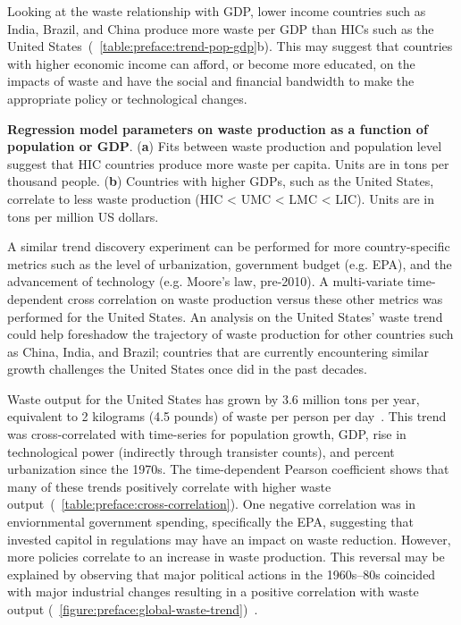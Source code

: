 \documentclass[../main/main]{subfiles}
\begin{document}
Looking at the waste relationship with GDP, lower income countries such as India, Brazil, and China produce more waste per GDP than HICs such as the United States~(\TABLE~\ref{table:preface:trend-pop-gdp}b). This may suggest that countries with higher economic income can afford, or become more educated, on the impacts of waste and have the social and financial bandwidth to make the appropriate policy or technological changes.

\begin{table}[H]
\small
\centering
	\begin{subtable}{.48\linewidth}
		\centering
		\caption{}
		
	\end{subtable}
	\begin{subtable}{.48\linewidth}
		\centering
		\caption{}
		
	\end{subtable}
	\caption[Regression model parameters on waste production as a function of population or GDP]
	{
		\textbf{Regression model parameters on waste production as a function of population or GDP}.
		(\textbf{a}) Fits between waste production and population level suggest that HIC countries produce more waste per capita. Units are in tons per thousand people.
		(\textbf{b}) Countries with higher GDPs, such as the United States, correlate to less waste production (HIC < UMC < LMC < LIC). Units are in tons per million US dollars.
	}
  \label{table:preface:trend-pop-gdp}
\end{table}

A similar trend discovery experiment can be performed for more country-specific metrics such as the level of urbanization, government budget (e.g. EPA), and the advancement of technology (e.g. Moore's law, pre-2010). A multi-variate time-dependent cross correlation on waste production versus these other metrics was performed for the United States. An analysis on the United States' waste trend could help foreshadow the trajectory of waste production for other countries such as China, India, and Brazil; countries that are currently encountering similar growth challenges the United States once did in the past decades.

Waste output for the United States has grown by 3.6 million tons per year, equivalent to 2 kilograms (4.5 pounds) of waste per person per day~\cite{usepa2017b}. This trend was cross-correlated with time-series for population growth, GDP, rise in technological power (indirectly through transister counts), and percent urbanization since the 1970s. The time-dependent Pearson coefficient shows that many of these trends positively correlate with higher waste output~(\TABLE~\ref{table:preface:cross-correlation}). One negative correlation was in enviornmental government spending, specifically the EPA, suggesting that invested capitol in regulations may have an impact on waste reduction. However, more policies correlate to an increase in waste production.
This reversal may be explained by observing that major political actions in the 1960s--80s coincided with major industrial changes resulting in a positive correlation with waste output (\FIGURE~\ref{figure:preface:global-waste-trend})~\cite{louis2004,andrews2018}.
\end{document}

